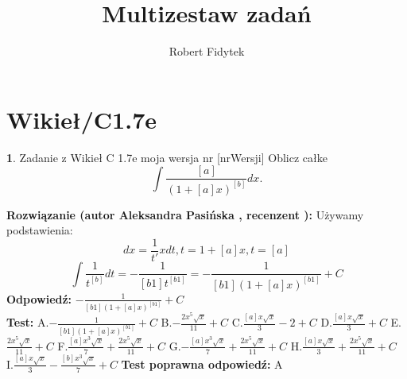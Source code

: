 \documentclass[12pt, a4paper]{article}
\title{Multizestaw zadań}
\author{Robert Fidytek}
\date{}
\theoremstyle{definition} %
\newtheorem{zad}{}
\newcommand{\kategoria}[1]{\section{#1}} %
\newcommand{\zadStart}[1]{\begin{zad}#1\newline} %
\newcommand{\zadStop}{\end{zad}}   %
\newcommand{\rozwStart}[2]{\noindent \textbf{Rozwiązanie (autor #1 , recenzent #2): }\newline} %
\newcommand{\rozwStop}{\newline}                                            %
\newcommand{\odpStart}{\noindent \textbf{Odpowiedź:}\newline}    %
\newcommand{\odpStop}{\newline}                                             %
\newcommand{\testStart}{\noindent \textbf{Test:}\newline} %
\newcommand{\testStop}{\newline} %
\newcommand{\kluczStart}{\noindent \textbf{Test poprawna odpowiedź:}\newline} %
\newcommand{\kluczStop}{\newline} %
\begin{document}
\maketitle


\kategoria{Wikieł/C1.7e}
\zadStart{Zadanie z Wikieł C 1.7e moja wersja nr [nrWersji]}
Oblicz całke $$\int \frac{[a]}{(1+[a]x)^{[b]}}dx.$$
\zadStop
\rozwStart{Aleksandra Pasińska}{}
Używamy podstawienia:
$$dx=\frac{1}{t'}xdt,t=1+[a]x, t=[a]$$
$$\int \frac{1}{t^{[b]}}dt=-\frac{1}{[b1]t^{[b1]}}=-\frac{1}{[b1](1+[a]x)^{[b1]}}+C$$
\rozwStop
\odpStart
$-\frac{1}{[b1](1+[a]x)^{[b1]}}+C$\\
\odpStop
\testStart
A.$-\frac{1}{[b1](1+[a]x)^{[b1]}}+C$
B.$-\frac{2x^5\sqrt{x}}{11}+C$
C.$\frac{[a]x\sqrt{x}}{3}-2+C$
D.$\frac{[a]x\sqrt{x}}{3}+C$
E.$\frac{2x^5\sqrt{x}}{11}+C$
F.$\frac{[a]x^3\sqrt{x}}{7}+\frac{2x^5\sqrt{x}}{11}+C$
G.$-\frac{[a]x^3\sqrt{x}}{7}+\frac{2x^5\sqrt{x}}{11}+C$
H.$\frac{[a]x\sqrt{x}}{3}+\frac{2x^5\sqrt{x}}{11}+C$
I.$\frac{[a]x\sqrt{x}}{3}-\frac{[b]x^3\sqrt{x}}{7}+C$
\testStop
\kluczStart
A
\kluczStop
\end{document}
